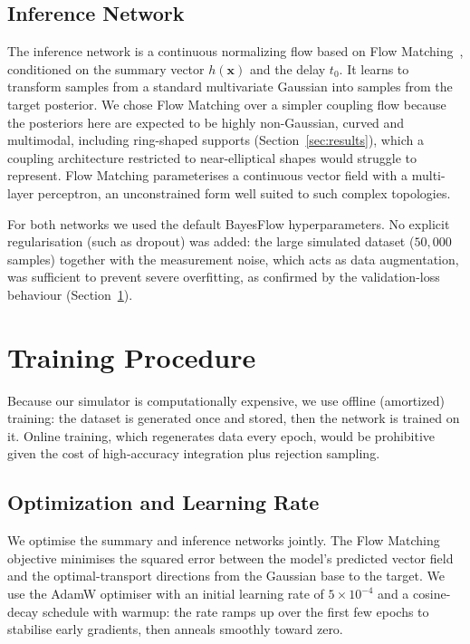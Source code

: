 \documentclass[12pt]{article}
\begin{document}
\subsection{Inference Network}
The inference network is a continuous normalizing flow based on Flow Matching~\cite{lipman2023}, conditioned on the
summary vector $h(\mathbf{x})$ and the delay $t_0$. It learns to transform samples from a standard
multivariate Gaussian into samples from the target posterior. We chose Flow Matching over a
simpler coupling flow because the posteriors here are expected to be highly non-Gaussian, curved
and multimodal, including ring-shaped supports (Section~\ref{sec:results}), which a coupling
architecture restricted to near-elliptical shapes would struggle to represent. Flow Matching
parameterises a continuous vector field with a multi-layer perceptron, an unconstrained form well
suited to such complex topologies.
 
For both networks we used the default BayesFlow hyperparameters. No explicit regularisation (such
as dropout) was added: the large simulated dataset ($50{,}000$ samples) together with the
measurement noise, which acts as data augmentation, was sufficient to prevent severe overfitting,
as confirmed by the validation-loss behaviour (Section~\ref{sec:training}).

\section{Training Procedure}
\label{sec:training}
Because our simulator is computationally expensive, we use offline (amortized) training: the
dataset is generated once and stored, then the network is trained on it. Online training, which
regenerates data every epoch, would be prohibitive given the cost of high-accuracy integration
plus rejection sampling.
 
\subsection{Optimization and Learning Rate}
We optimise the summary and inference networks jointly. The Flow Matching objective minimises the
squared error between the model's predicted vector field and the optimal-transport directions from
the Gaussian base to the target. We use the AdamW optimiser with an initial learning rate of
$5\times10^{-4}$ and a cosine-decay schedule with warmup: the rate ramps up over the first few
epochs to stabilise early gradients, then anneals smoothly toward zero.
 
\end{document}
